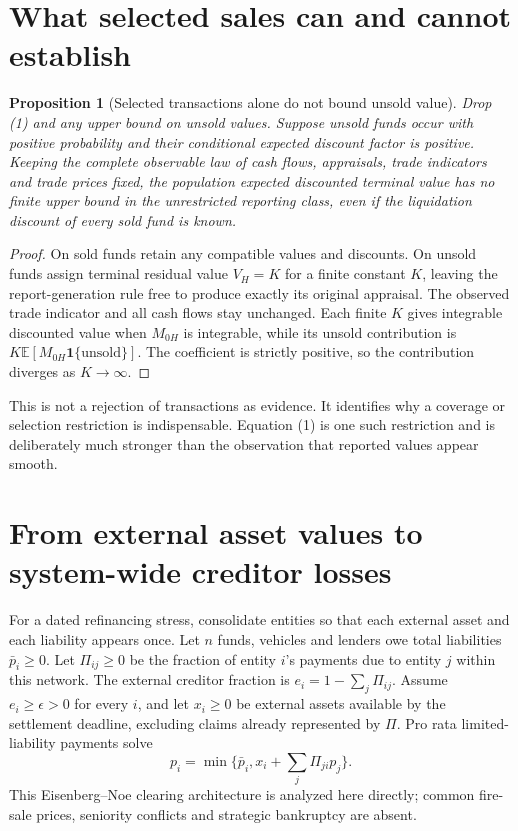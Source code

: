 \documentclass[11pt]{article}
\newtheorem{proposition}[theorem]{Proposition}
\theoremstyle{remark}
\newcommand{\E}{\mathbb E}
\newcommand{\Ind}{\mathbf 1}
\begin{document}
\section{What selected sales can and cannot establish}
\begin{proposition}[Selected transactions alone do not bound unsold value]
Drop (1) and any upper bound on unsold values. Suppose unsold funds occur
with positive probability and their conditional expected discount factor
is positive. Keeping the complete observable law of cash flows, appraisals,
trade indicators and trade prices fixed, the population expected discounted
terminal value has no finite upper bound in the unrestricted reporting
class, even if the liquidation discount of every sold fund is known.
\end{proposition}
\begin{proof}
On sold funds retain any compatible values and discounts. On unsold funds
assign terminal residual value $V_H=K$ for a finite constant $K$, leaving
the report-generation rule free to produce exactly its original appraisal.
The observed trade indicator and all cash flows stay unchanged. Each
finite $K$ gives integrable discounted value when $M_{0H}$ is integrable,
while its unsold contribution is
$K\E[M_{0H}\Ind\{\text{unsold}\}]$. The coefficient is strictly
positive, so the contribution diverges as $K\to\infty$.
\end{proof}
This is not a rejection of transactions as evidence. It identifies why
a coverage or selection restriction is indispensable. Equation (1) is one
such restriction and is deliberately much stronger than the observation
that reported values appear smooth.

\section{From external asset values to system-wide creditor losses}
For a dated refinancing stress, consolidate entities so that each external
asset and each liability appears once. Let $n$ funds, vehicles and lenders
owe total liabilities $\bar p_i\geq0$. Let $\Pi_{ij}\geq0$ be the fraction
of entity $i$'s payments due to entity $j$ within this network. The external
creditor fraction is $e_i=1-\sum_j\Pi_{ij}$. Assume
$e_i\geq\epsilon>0$ for every $i$, and let $x_i\geq0$ be external assets
available by the settlement deadline, excluding claims already represented
by $\Pi$. Pro rata limited-liability payments solve
\[
 p_i=\min\{\bar p_i,x_i+\sum_j\Pi_{ji}p_j\}.                      \tag{5}
\]
This Eisenberg--Noe clearing architecture \cite{en} is analyzed here directly; common
fire-sale prices, seniority conflicts and strategic bankruptcy are absent.
\end{document}
